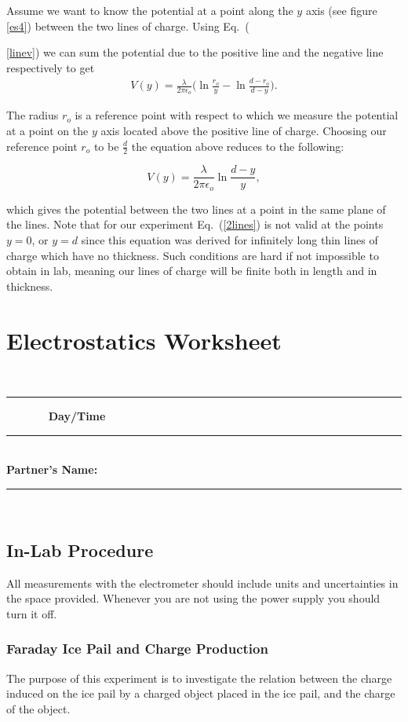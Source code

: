 {{{Assume we want to know the potential at a point along the $y$ axis
(see figure \ref{es4}) between the two lines of charge. Using
Eq.~({\ref{linev}) we can sum the potential due to the positive
line and the negative line respectively to get
\begin{eqnarray*}
V(y)=
\frac{\lambda}{2\pi\epsilon_o}\big(\ln{\frac{r_o}{y}}-\ln{\frac{d-r_o}{d-y}}\big).
\label{exv}
\end{eqnarray*}

The radius $r_o$ is a reference point with respect to which we
measure the potential at a point on the $y$ axis located above the
positive line of charge.  Choosing our reference point $r_o$ to be
$\frac{d}{2}$ the equation above reduces to the following:

\begin{equation}
V(y)=\frac{\lambda}{2\pi\epsilon_o}\ln{\frac{d-y}{y}},\label{2lines}
\end{equation}

\noindent which gives the potential between the two lines at a
point in the same plane of the lines.  Note that for our
experiment Eq.~(\ref{2lines}) is not valid at the points $y=0$, or
$y=d$ since this equation was derived for infinitely long thin
lines of charge which have no thickness.  Such conditions are hard
if not impossible to obtain in lab, meaning our lines of charge
will be finite both in length and in thickness.

\vfill
\clearpage

\renewcommand{\thesection}{\thechapter.W}
\section{Electrostatics Worksheet}
~\rule{5.0cm}{0.1mm}~~~~~~~ {\bf\Large
Day/Time}~\rule{3cm}{.1mm}\\
{\bf\Large Partner's Name:}~\rule{6cm}{.1mm}\\
\noindent
\subsection{In-Lab Procedure}

All measurements with the electrometer should include units and
uncertainties in the space provided. Whenever you are not using
the power supply you should turn it off.

\subsubsection{Faraday Ice Pail and Charge Production}
The purpose of this experiment is to investigate the relation
between the charge induced on the ice pail by a charged object
placed in the ice pail, and the charge of the object.

}}}}
